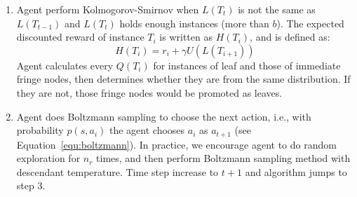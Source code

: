 \documentclass{article}
\begin{document}
\begin{enumerate}
  \item Agent perform Kolmogorov-Smirnov when $L(T_t)$ is not the same as $L(T_{t-1})$ and
  $L(T_t)$ holds enough instances (more than $b$). The expected discounted reward of instance
  $T_i$ is written as $H(T_i)$, and is defined as:
    \begin{equation}
      H(T_i) = r_i + \gamma U(L(T_{i+1}))
    \end{equation}
  Agent calculates every $Q(T_i)$ for instances of leaf and those of immediate fringe nodes,
  then determines whether they are from the same distribution. If they are not, those
  fringe nodes would be promoted as leaves.

  \item Agent does Boltzmann sampling to choose the next action, i.e., with
  probability $p(s, a_i)$ the agent chooses $a_i$ as $a_{t+1}$ (see Equation~\ref{equ:boltzmann}).
  In practice, we encourage agent to do random exploration for $n_r$ times, and then perform
  Boltzmann sampling method with descendant temperature.
  Time step increase to $t+1$ and algorithm jumps to step 3.
\end{enumerate}
\end{document}
